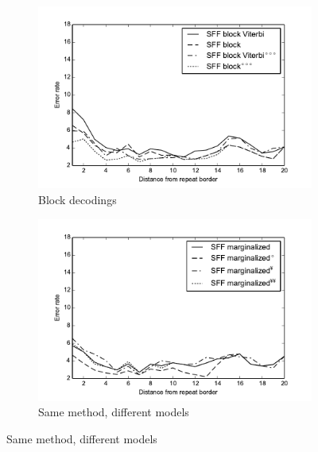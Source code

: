 \begin{figure}
\begin{center}
\begin{subfigure}{0.5\textwidth}
\includegraphics[width=\textwidth]{../figures/error_graph_sffblock.pdf}
\caption{Block decodings}
\end{subfigure}%
\begin{subfigure}{0.5\textwidth}
\includegraphics[width=\textwidth]{../figures/error_graph_marginalized.pdf}
\caption{Same method, different models}
\end{subfigure}%


\end{center}
\end{figure}
